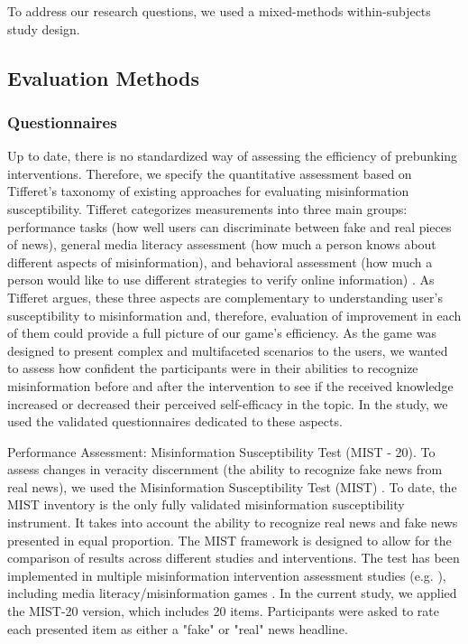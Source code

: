 To address our research questions, we used a mixed-methods within-subjects study design.
\subsection{Evaluation Methods}
\subsubsection{Questionnaires}
Up to date, there is no standardized way of assessing the efficiency of prebunking interventions. Therefore, we specify the quantitative assessment %
based on Tifferet’s taxonomy of existing approaches \cite{tifferet2021verifying} for evaluating misinformation susceptibility. Tifferet categorizes measurements into three main groups: performance tasks (how well users can discriminate between fake and real pieces of news), general media literacy assessment (how much a person knows about different aspects of misinformation), and behavioral assessment (how much a person would like to use different strategies to verify online information) \cite{tifferet2021verifying}. As Tifferet argues, these three aspects are complementary to understanding user’s susceptibility to misinformation and, therefore, evaluation of improvement in each of them could provide a full picture of our game's efficiency.
As the game was designed to present complex and multifaceted scenarios to the users, we wanted to assess how confident the participants were in their abilities to recognize misinformation before and after the intervention to see if the received knowledge increased or decreased their perceived self-efficacy in the topic.
In the study, we used the validated questionnaires dedicated to these aspects.%

{Performance Assessment}: Misinformation Susceptibility Test (MIST - 20). To assess changes in veracity discernment (the ability to recognize fake news from real news), we used the Misinformation Susceptibility Test (MIST) \cite{maertens2024misinformation}. 
To date, the MIST inventory is the only fully validated misinformation susceptibility instrument. It takes into account the ability to recognize real news and fake news presented in equal proportion. The MIST framework is designed to allow for the comparison of results across different studies and interventions. The test has been implemented in multiple misinformation intervention assessment studies (e.g. \cite{roozenbeek2022psychological,spampatti2024psychological}), including media literacy/misinformation games  \cite{bradstreet2023data,wells2024doomscroll}. In the current study, we applied the MIST-20 version, which includes 20 items. Participants were asked to rate each presented item as either a "fake" or "real" news headline.

